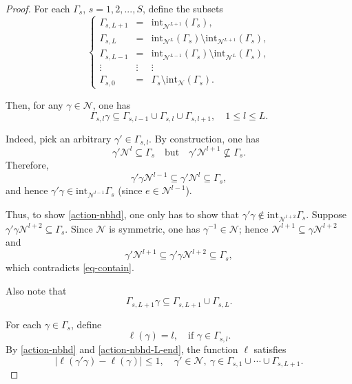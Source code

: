 \documentclass[12pt, oneside, psamsfonts]{amsart}
\theoremstyle{definition}
\theoremstyle{remark}
\numberwithin{equation}{section}
\newcommand{\abs}[1]{\left\vert#1\right\vert}
\begin{document}
\begin{proof}
For each $\Gamma_s$, $s=1, 2, ..., S$, define the subsets 
$$
\left\{
\begin{array}{lll}
\Gamma_{s, L+1} & = & \mathrm{int}_{\mathcal N^{L+1}} (\Gamma_s), \\
\Gamma_{s, L} & = & \mathrm{int}_{\mathcal N^{L}} (\Gamma_s) \setminus \mathrm{int}_{\mathcal N^{L+1}} (\Gamma_s), \\
\Gamma_{s, L-1} & = & \mathrm{int}_{\mathcal N^{L-1}} (\Gamma_s) \setminus \mathrm{int}_{\mathcal N^{L}} (\Gamma_s), \\
\vdots & \vdots & \vdots \\
\Gamma_{s, 0} & = & \Gamma_s \setminus \mathrm{int}_{\mathcal N} (\Gamma_s).
\end{array}
\right.
$$


Then, for any $\gamma \in\mathcal N$, one has 
\begin{equation}\label{action-nbhd}
\Gamma_{s, l}\gamma \subseteq  \Gamma_{s, l-1} \cup \Gamma_{s, l} \cup \Gamma_{s, l+1},\quad 1\leq l \leq L.  \end{equation}

Indeed,  pick an arbitrary $\gamma'\in \Gamma_{s, l}$. By construction, one has 
\begin{equation}\label{eq-contain} 
\gamma' \mathcal N^{l} \subseteq \Gamma_s\quad\mathrm{but}\quad \gamma' \mathcal N^{l+1} \nsubseteq \Gamma_s.
\end{equation} 
Therefore, $$ \gamma'\gamma \mathcal N^{l-1}  \subseteq \gamma' \mathcal N^l \subseteq \Gamma_s, $$ and hence $\gamma'\gamma \in \mathrm{int}_{\mathcal N^{l-1}}\Gamma_s$ (since $e\in\mathcal N^{l-1}$). 

Thus, to show \eqref{action-nbhd}, one only has to show that $\gamma'\gamma \notin \mathrm{int}_{\mathcal N^{l+2}}\Gamma_s$. Suppose $\gamma'\gamma\mathcal N^{l+2} \subseteq \Gamma_s$. Since $\mathcal N$ is symmetric, one has $\gamma^{-1}\in \mathcal N$; hence $\mathcal N^{l+1} \subseteq \gamma \mathcal N^{l+2}$ and 
$$\gamma' \mathcal N^{l+1} \subseteq \gamma'\gamma \mathcal N^{l+2} \subseteq \Gamma_s,$$ which contradicts \eqref{eq-contain}.

Also note that
\begin{equation}\label{action-nbhd-L-end}
\Gamma_{s, L+1}\gamma \subseteq  \Gamma_{s, L+1} \cup \Gamma_{s, L}.
\end{equation}

For each $\gamma \in \Gamma_s$, define
$$\ell(\gamma) = l,\quad\textrm{if $\gamma \in \Gamma_{s, l}$}.$$ By \eqref{action-nbhd} and \eqref{action-nbhd-L-end}, the function $\ell$ satisfies 
\begin{equation}\label{action-nbhd-fn}
\abs{\ell(\gamma'\gamma) - \ell(\gamma)} \leq 1,\quad \gamma'\in \mathcal N,\ \gamma\in \Gamma_{s, 1}\cup\cdots\cup\Gamma_{s, L+1}.
\end{equation}


\end{proof}
\end{document}
